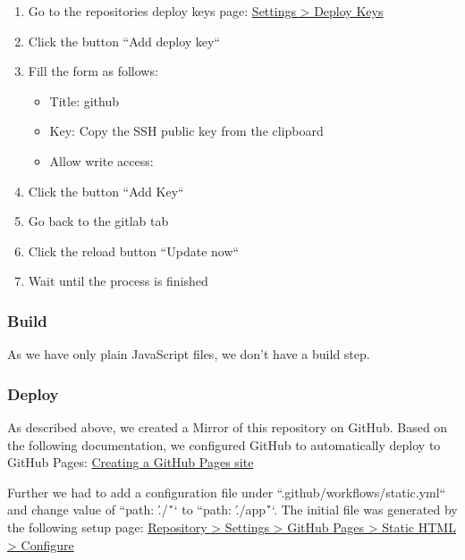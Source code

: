 \begin{enumerate}
    \item Go to the repositories deploy keys page: \href{https://github.com/decibel-threshold-event-displayer/decibel-threshold-event-displayer.github.io/settings/keys}{Settings > Deploy Keys}
    \item Click the button ``Add deploy key``
    \item Fill the form as follows:
    \begin{itemize}
        \item Title: github
        \item Key: Copy the SSH public key from the clipboard
        \item Allow write access:
    \end{itemize}
    \item Click the button ``Add Key``
    \item Go back to the gitlab tab
    \item Click the reload button ``Update now``
    \item Wait until the process is finished
\end{enumerate}

\subsubsection{Build}
As we have only plain JavaScript files, we don't have a build step.

\subsubsection{Deploy}
As described above, we created a Mirror of this repository on GitHub.
Based on the following documentation, we configured GitHub to automatically deploy to GitHub Pages:
\href{https://docs.github.com/en/pages/getting-started-with-github-pages/creating-a-github-pages-site}{Creating a GitHub Pages site}

Further we had to add a configuration file under ``.github/workflows/static.yml`` and change value of ``path: \'./\'`` to ``path: \'./app\'``.
The initial file was generated by the following setup page:
\href{https://github.com/decibel-threshold-event-displayer/decibel-threshold-event-displayer.github.io/new/main?filename=.github%2Fworkflows%2Fstatic.yml&pages_workflow_template=pages%2Fstatic}{Repository > Settings > GitHub Pages > Static HTML > Configure}


